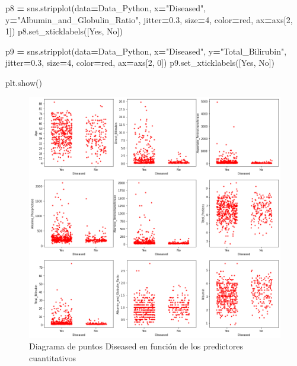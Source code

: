 \documentclass[
  11pt,
  a4paper,
]{article}
\newenvironment{Shaded}{\begin{snugshade}}{\end{snugshade}}
\newcommand{\DecValTok}[1]{\textcolor[rgb]{0.00,0.00,0.81}{#1}}
\newcommand{\FloatTok}[1]{\textcolor[rgb]{0.00,0.00,0.81}{#1}}
\newcommand{\NormalTok}[1]{#1}
\newcommand{\OperatorTok}[1]{\textcolor[rgb]{0.81,0.36,0.00}{\textbf{#1}}}
\newcommand{\StringTok}[1]{\textcolor[rgb]{0.31,0.60,0.02}{#1}}
\begin{document}
\begin{Shaded}
\begin{Highlighting}[]
\NormalTok{p8 }\OperatorTok{=}\NormalTok{ sns.stripplot(data}\OperatorTok{=}\NormalTok{Data\_Python, x}\OperatorTok{=}\StringTok{"Diseased"}\NormalTok{, y}\OperatorTok{=}\StringTok{"Albumin\_and\_Globulin\_Ratio"}\NormalTok{, jitter}\OperatorTok{=}\FloatTok{0.3}\NormalTok{, size}\OperatorTok{=}\DecValTok{4}\NormalTok{, color}\OperatorTok{=}\StringTok{\textquotesingle{}red\textquotesingle{}}\NormalTok{, ax}\OperatorTok{=}\NormalTok{axs[}\DecValTok{2}\NormalTok{, }\DecValTok{1}\NormalTok{])}
\NormalTok{p8.set\_xticklabels([}\StringTok{\textquotesingle{}Yes\textquotesingle{}}\NormalTok{, }\StringTok{\textquotesingle{}No\textquotesingle{}}\NormalTok{])}

\NormalTok{p9 }\OperatorTok{=}\NormalTok{ sns.stripplot(data}\OperatorTok{=}\NormalTok{Data\_Python, x}\OperatorTok{=}\StringTok{"Diseased"}\NormalTok{, y}\OperatorTok{=}\StringTok{"Total\_Bilirubin"}\NormalTok{, jitter}\OperatorTok{=}\FloatTok{0.3}\NormalTok{, size}\OperatorTok{=}\DecValTok{4}\NormalTok{, color}\OperatorTok{=}\StringTok{\textquotesingle{}red\textquotesingle{}}\NormalTok{, ax}\OperatorTok{=}\NormalTok{axs[}\DecValTok{2}\NormalTok{, }\DecValTok{0}\NormalTok{])}
\NormalTok{p9.set\_xticklabels([}\StringTok{\textquotesingle{}Yes\textquotesingle{}}\NormalTok{, }\StringTok{\textquotesingle{}No\textquotesingle{}}\NormalTok{])}


\NormalTok{plt.show()}
\end{Highlighting}
\end{Shaded}

\begin{figure}
\centering
\includegraphics{output_214_0.png}
\caption{Diagrama de puntos Diseased en función de los predictores
cuantitativos}
\end{figure}
\end{document}
